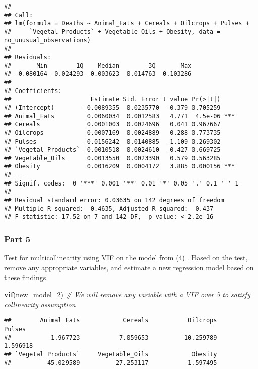 \documentclass[
]{article}
\newenvironment{Shaded}{\begin{snugshade}}{\end{snugshade}}
\newcommand{\CommentTok}[1]{\textcolor[rgb]{0.56,0.35,0.01}{\textit{#1}}}
\newcommand{\DecValTok}[1]{\textcolor[rgb]{0.00,0.00,0.81}{#1}}
\newcommand{\KeywordTok}[1]{\textcolor[rgb]{0.13,0.29,0.53}{\textbf{#1}}}
\newcommand{\NormalTok}[1]{#1}
\begin{document}
\begin{verbatim}
## 
## Call:
## lm(formula = Deaths ~ Animal_Fats + Cereals + Oilcrops + Pulses + 
##     `Vegetal Products` + Vegetable_Oils + Obesity, data = no_unusual_observations)
## 
## Residuals:
##       Min        1Q    Median        3Q       Max 
## -0.080164 -0.024293 -0.003623  0.014763  0.103286 
## 
## Coefficients:
##                      Estimate Std. Error t value Pr(>|t|)    
## (Intercept)        -0.0089355  0.0235770  -0.379 0.705259    
## Animal_Fats         0.0060034  0.0012583   4.771  4.5e-06 ***
## Cereals             0.0001003  0.0024696   0.041 0.967667    
## Oilcrops            0.0007169  0.0024889   0.288 0.773735    
## Pulses             -0.0156242  0.0140885  -1.109 0.269302    
## `Vegetal Products` -0.0010518  0.0024610  -0.427 0.669725    
## Vegetable_Oils      0.0013550  0.0023390   0.579 0.563285    
## Obesity             0.0016209  0.0004172   3.885 0.000156 ***
## ---
## Signif. codes:  0 '***' 0.001 '**' 0.01 '*' 0.05 '.' 0.1 ' ' 1
## 
## Residual standard error: 0.03635 on 142 degrees of freedom
## Multiple R-squared:  0.4635, Adjusted R-squared:  0.437 
## F-statistic: 17.52 on 7 and 142 DF,  p-value: < 2.2e-16
\end{verbatim}

\hypertarget{part-5}{%
\subsubsection{Part 5}\label{part-5}}

Test for multicollinearity using VIF on the model from (4) . Based on
the test, remove any appropriate variables, and estimate a new
regression model based on these findings.

\begin{Shaded}
\begin{Highlighting}[]
\KeywordTok{vif}\NormalTok{(new_model_}\DecValTok{2}\NormalTok{) }\CommentTok{# We will remove any variable with a VIF over 5 to satisfy collinearity assumption}
\end{Highlighting}
\end{Shaded}

\begin{verbatim}
##        Animal_Fats            Cereals           Oilcrops             Pulses 
##           1.967723           7.059653          10.259789           1.596918 
## `Vegetal Products`     Vegetable_Oils            Obesity 
##          45.029589          27.253117           1.597495
\end{verbatim}
\end{document}
